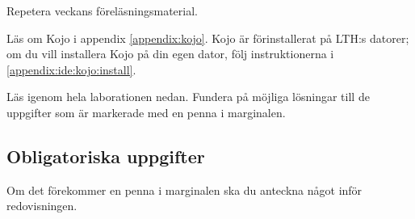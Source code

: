
\Lab{\LabWeekONE}
%
\begin{Goals}

\end{Goals}

\begin{Preparations}
\item Repetera veckans föreläsningsmaterial.
\item {}%
\item Läs om Kojo i appendix \ref{appendix:kojo}. Kojo är förinstallerat på LTH:s datorer; om du vill installera Kojo på din egen dator, följ instruktionerna i \ref{appendix:ide:kojo:install}.
\item Läs igenom hela laborationen nedan. Fundera på möjliga lösningar till de uppgifter som är markerade med en penna i marginalen.
\end{Preparations}

\subsection{Obligatoriska uppgifter}

Om det förekommer en penna i marginalen ska du anteckna något inför redovisningen.


